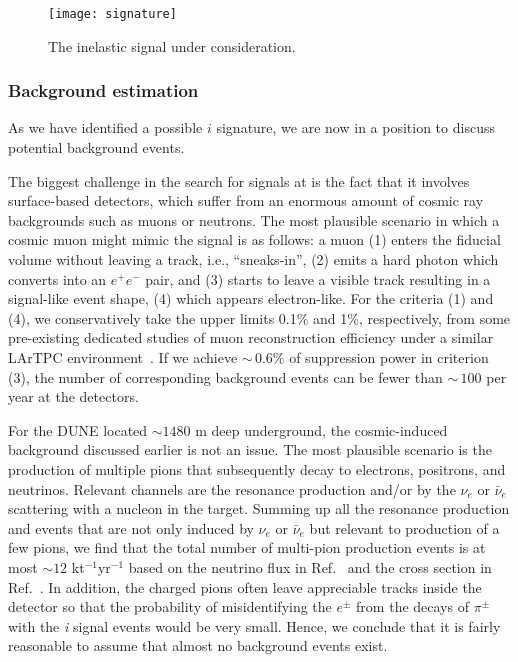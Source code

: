 \begin{figure}[t]
\centering
\texttt{[image: signature]}
\caption{\label{fig:sig} The inelastic  signal under consideration.}
\end{figure}

\subsubsection{Background estimation}

As we have identified a possible $i$ signature, we are now in a position to discuss potential  background events. 

The biggest challenge in the search for  signals at  is the fact that it involves surface-based detectors, which suffer from an enormous amount of cosmic ray backgrounds such as muons or neutrons.
The most plausible scenario in which a cosmic muon might mimic the signal is as follows: a muon (1) enters the fiducial volume without leaving a track, i.e., ``sneaks-in'', (2) emits a hard photon which converts into an $e^+ e^-$ pair, and (3) starts to leave a visible track resulting in a signal-like event shape, (4) which appears electron-like.
For the criteria (1) and (4), we conservatively take the upper limits 0.1\% and 1\%, respectively, from some pre-existing dedicated studies of muon reconstruction efficiency under a similar LArTPC %
environment~\cite{MicroBooNEmuon, Acciarri:2016sli}.
If we achieve $\sim\,0.6\%$ of suppression power in criterion (3), the number of corresponding background events can be fewer than $\sim\,100$ per year at the  detectors. 


For the DUNE  located $\sim 1480$ m deep underground, the cosmic-induced background discussed earlier is not an issue. 
The most plausible scenario  is the production of multiple pions that subsequently decay to electrons, positrons, and neutrinos. 
Relevant channels are the resonance production and/or  by the  $\nu_e$ or $\bar \nu_e$ scattering with a nucleon in the \lar target.
Summing up all the resonance production and  events that are not only induced by $\nu_e$ or $\bar \nu_e$ 
but relevant to production of a few pions, we find that the total number of multi-pion production events is at most $\sim 12$ kt$^{-1}$yr$^{-1}$ based on the neutrino flux in Ref.~\cite{Honda:2015fha} and the cross section in Ref.~\cite{Formaggio:2013kya}.
In addition, the charged pions often leave appreciable tracks inside the detector so that the probability of misidentifying the $e^\pm$ from the decays of $\pi^\pm$ with the \textit{i} signal events would be very small.
Hence, we conclude that it is fairly reasonable to assume that almost no background events exist.

